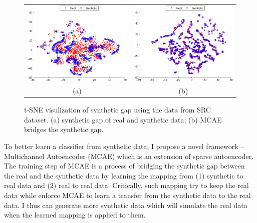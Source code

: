 \documentclass{iitthesis}
\begin{document}
\begin{figure}[h]
\centering
\begin{tabular}{cc}
\includegraphics[scale=0.49]{Pic/PDF/Autoencoder/tsne_visualization/Real2-crop} 
& 
\includegraphics[scale=0.49]{Pic/PDF/Autoencoder/tsne_visualization/Reconst2-crop}\tabularnewline
(a) & (b)\tabularnewline
\end{tabular}\protect\caption{t-SNE visulization of synthetic gap using the data from SRC dataset. (a) synthetic gap of real and
synthetic data; (b) MCAE bridges the synthetic gap.}
\label{fig: tsne_vis} 
\end{figure}

To better learn a classifier from synthetic data, I propose a novel framework --Multichannel Autoencoder (MCAE) which is an extension of sparse autoencoder. The training step of MCAE is a process of bridging the synthetic gap between the real and the synthetic data by learning the mapping from (1) synthetic to real data and (2) real to real data. Critically, such mapping try to keep the real data  while enforce MCAE to learn a transfer from the synthetic data to the real data. I thus can generate more synthetic data which will simulate the real data when the learned mapping is applied to them.
\end{document}
